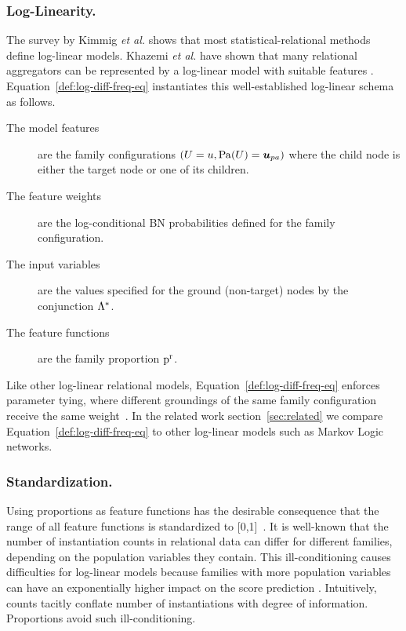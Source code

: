 \documentclass[runningheads,a4paper]{llncs}
\begin{document}
\subsubsection{Log-Linearity.}
The survey by Kimmig {\em et al.} \cite{Kimmig2014} shows that most statistical-relational methods define log-linear models.  Khazemi {\em et al.} have shown that many relational aggregators can be represented by a log-linear model with suitable features \cite{Kazemi2014}. 
Equation~\eqref{def:log-diff-freq-eq} instantiates this well-established log-linear schema as follows.

\begin{description}
\item[The model features] are the family configurations $(\Appendterm{\UT  = \UV} {\Pa{\UT} = \Prange{\UT}})$ where the child node is either the target node or one of its children.
\item[The feature weights]  are the log-conditional BN probabilities defined for the family configuration. 
\item[The input variables] are the values specified for the ground (non-target) nodes by the conjunction $\Lambda^{*}\hspace{0.0ex}$.
\item[The feature functions] are the family proportion $\mathrm{p}^{\mathrm{r}}$. 
\end{description}

%
 Like other log-linear relational models, Equation~\ref{def:log-diff-freq-eq} enforces parameter tying, where different groundings of the same family configuration receive the same weight~\cite{Kimmig2014}. In the related work section~\ref{sec:related} we compare Equation~\ref{def:log-diff-freq-eq} to other log-linear models such as Markov Logic networks.

\subsubsection{Standardization.} Using proportions as feature functions has the desirable consequence that the range of all feature functions is standardized to [0,1]~\cite{Ravkic2015}. It is well-known that the number of instantiation counts in relational data can differ for different families, depending on the population variables they contain. This ill-conditioning causes difficulties for log-linear models because families with more population variables can have an exponentially higher impact on the score prediction \cite{Lowd2007}. Intuitively, counts tacitly conflate number of instantiations with degree of information. Proportions avoid such ill-conditioning.
\end{document}
